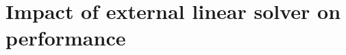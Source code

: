 \section{Impact of external linear solver on performance} \label{s:results:performance-external-linear-solver}
